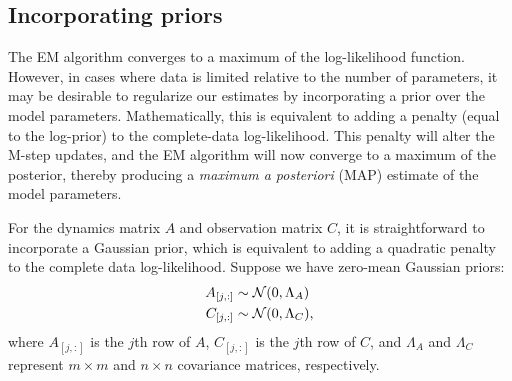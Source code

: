 \documentclass[10pt]{article}
\begin{document}
\begin{appendices}
\section{Incorporating priors}

The EM algorithm converges to a maximum of the log-likelihood
function.  However, in cases where data is limited relative to the
number of parameters, it may be desirable to regularize our estimates
by incorporating a prior over the model parameters. Mathematically,
this is equivalent to adding a penalty (equal to the log-prior) to the
complete-data log-likelihood.  This penalty will alter the M-step
updates, and the EM algorithm will now converge to a maximum of the
posterior, thereby producing a {\it maximum a posteriori} (MAP)
estimate of the model parameters.

For the dynamics
matrix $A$ and observation matrix $C$, it is straightforward to
incorporate a Gaussian prior, which is equivalent to adding a
quadratic penalty to the complete data log-likelihood.  Suppose we
have zero-mean Gaussian priors:
\begin{align}
  A_{[j,:]} &\sim \mathcal{N}(0, \Lambda_A) \\
  C_{[j,:]} &\sim \mathcal{N}(0, \Lambda_C),  
\end{align}
where $A_{[j,:]}$ is the $j$th row of $A$, $C_{[j,:]}$ is the
$j$th row of $C$, and $\Lambda_A$ and $\Lambda_C$ represent $m\times m$
and $n \times n$ covariance matrices, respectively. 


\end{appendices}
\end{document}
